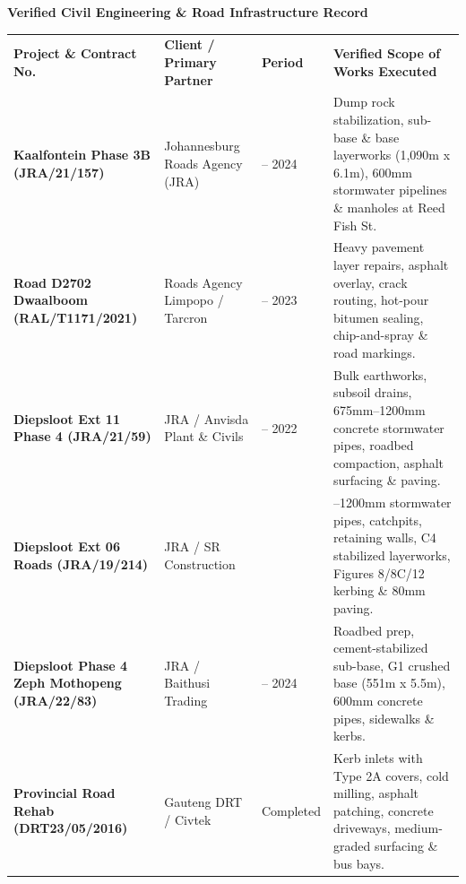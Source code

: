\documentclass[a4paper,11pt]{article}
\begin{document}
\vfill

{\large\bfseries\color{mhnavy} Verified Civil Engineering \& Road Infrastructure Record}
\vspace{0.12cm}

\renewcommand{\arraystretch}{1.32}
\begin{tabularx}{\textwidth}{@{}p{3.8cm} p{3.2cm} p{1.8cm} X@{}}
\rowcolor{mhnavy}
{\color{white}\bfseries\fontsize{8pt}{9.8pt}\selectfont Project \& Contract No.} &
{\color{white}\bfseries\fontsize{8pt}{9.8pt}\selectfont Client / Primary Partner} &
{\color{white}\bfseries\fontsize{8pt}{9.8pt}\selectfont Period} &
{\color{white}\bfseries\fontsize{8pt}{9.8pt}\selectfont Verified Scope of Works Executed} \\
\rowcolor{mhbluelight}
\fontsize{7.6pt}{9.4pt}\selectfont\bfseries Kaalfontein Phase 3B (JRA/21/157) & \fontsize{7.6pt}{9.4pt}\selectfont Johannesburg Roads Agency (JRA) & \fontsize{7.6pt}{9.4pt}\selectfont 2023 -- 2024 & \fontsize{7.6pt}{9.4pt}\selectfont Dump rock stabilization, sub-base \& base layerworks (1,090m x 6.1m), 600mm stormwater pipelines \& manholes at Reed Fish St. \\
\fontsize{7.6pt}{9.4pt}\selectfont\bfseries Road D2702 Dwaalboom (RAL/T1171/2021) & \fontsize{7.6pt}{9.4pt}\selectfont Roads Agency Limpopo / Tarcron & \fontsize{7.6pt}{9.4pt}\selectfont 2021 -- 2023 & \fontsize{7.6pt}{9.4pt}\selectfont Heavy pavement layer repairs, asphalt overlay, crack routing, hot-pour bitumen sealing, chip-and-spray \& road markings. \\
\rowcolor{mhbluelight}
\fontsize{7.6pt}{9.4pt}\selectfont\bfseries Diepsloot Ext 11 Phase 4 (JRA/21/59) & \fontsize{7.6pt}{9.4pt}\selectfont JRA / Anvisda Plant \& Civils & \fontsize{7.6pt}{9.4pt}\selectfont 2021 -- 2022 & \fontsize{7.6pt}{9.4pt}\selectfont Bulk earthworks, subsoil drains, 675mm--1200mm concrete stormwater pipes, roadbed compaction, asphalt surfacing \& paving. \\
\fontsize{7.6pt}{9.4pt}\selectfont\bfseries Diepsloot Ext 06 Roads (JRA/19/214) & \fontsize{7.6pt}{9.4pt}\selectfont JRA / SR Construction & \fontsize{7.6pt}{9.4pt}\selectfont 2019 & \fontsize{7.6pt}{9.4pt}\selectfont 450mm--1200mm stormwater pipes, catchpits, retaining walls, C4 stabilized layerworks, Figures 8/8C/12 kerbing \& 80mm paving. \\
\rowcolor{mhbluelight}
\fontsize{7.6pt}{9.4pt}\selectfont\bfseries Diepsloot Phase 4 Zeph Mothopeng (JRA/22/83) & \fontsize{7.6pt}{9.4pt}\selectfont JRA / Baithusi Trading & \fontsize{7.6pt}{9.4pt}\selectfont 2023 -- 2024 & \fontsize{7.6pt}{9.4pt}\selectfont Roadbed prep, cement-stabilized sub-base, G1 crushed base (551m x 5.5m), 600mm concrete pipes, sidewalks \& kerbs. \\
\fontsize{7.6pt}{9.4pt}\selectfont\bfseries Provincial Road Rehab (DRT23/05/2016) & \fontsize{7.6pt}{9.4pt}\selectfont Gauteng DRT / Civtek & \fontsize{7.6pt}{9.4pt}\selectfont Completed & \fontsize{7.6pt}{9.4pt}\selectfont Kerb inlets with Type 2A covers, cold milling, asphalt patching, concrete driveways, medium-graded surfacing \& bus bays. \\
\end{tabularx}
\renewcommand{\arraystretch}{1}
\end{document}

